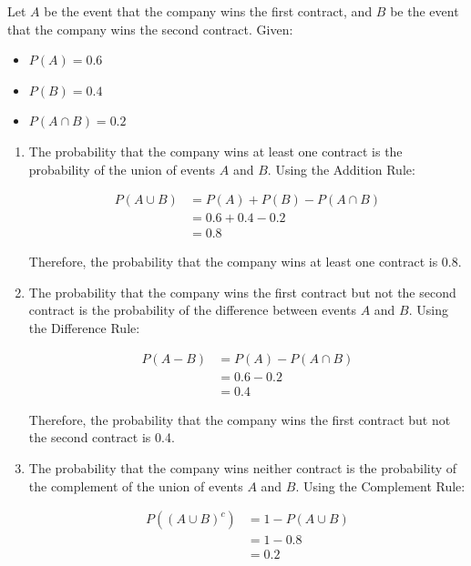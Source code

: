 \begin{solution}
    Let $A$ be the event that the company wins the first contract, and $B$ be the event that the company wins the second contract. Given:
    \begin{itemize}
        \item $P(A) = 0.6$
        \item $P(B) = 0.4$
        \item $P(A \cap B) = 0.2$
    \end{itemize}

    \begin{enumerate}[label=(\alph*)]
        \item The probability that the company wins at least one contract is the probability of the union of events $A$ and $B$. Using the Addition Rule:

        \begin{align*}
            P(A \cup B) &= P(A) + P(B) - P(A \cap B) \\
                        &= 0.6 + 0.4 - 0.2 \\
                        &= 0.8
        \end{align*}

        Therefore, the probability that the company wins at least one contract is 0.8.

        \item The probability that the company wins the first contract but not the second contract is the probability of the difference between events $A$ and $B$. Using the Difference Rule:

        \begin{align*}
            P(A - B) &= P(A) - P(A \cap B) \\
                    &= 0.6 - 0.2 \\
                    &= 0.4
        \end{align*}

        Therefore, the probability that the company wins the first contract but not the second contract is 0.4.

        \item The probability that the company wins neither contract is the probability of the complement of the union of events $A$ and $B$. Using the Complement Rule:

        \begin{align*}
            P((A \cup B)^c) &= 1 - P(A \cup B) \\
                                    &= 1 - 0.8 \\
                                    &= 0.2
        \end{align*}


\end{enumerate}
\end{solution}
